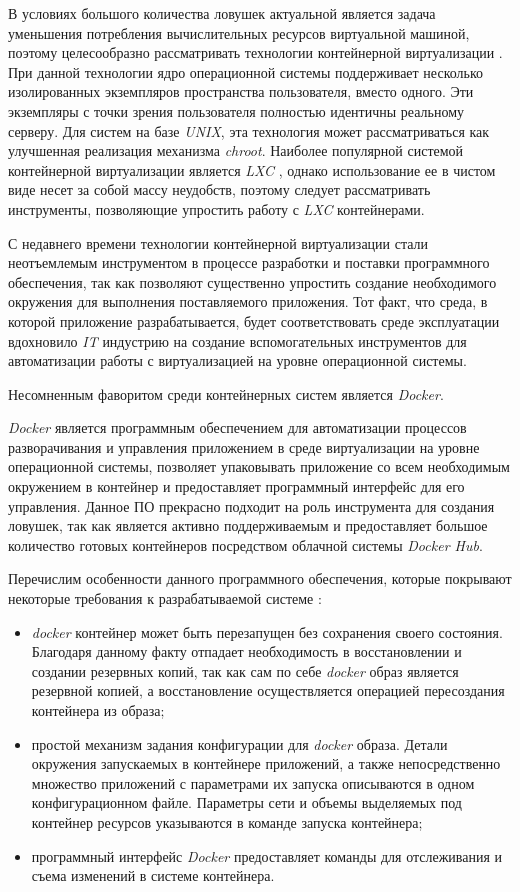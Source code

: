 В условиях большого количества ловушек актуальной является задача уменьшения потребления вычислительных ресурсов виртуальной машиной, поэтому целесообразно рассматривать технологии контейнерной виртуализации \citep{Joy2015}. При данной технологии ядро операционной системы поддерживает несколько изолированных экземпляров пространства пользователя, вместо одного. Эти экземпляры с точки зрения пользователя полностью идентичны реальному серверу. Для систем на базе \textit{UNIX}, эта технология может рассматриваться как улучшенная реализация механизма \textit{chroot}. Наиболее популярной системой контейнерной виртуализации является \textit{LXC} \citep{lxc_doc}, однако использование ее в чистом виде несет за собой массу неудобств, поэтому следует рассматривать инструменты, позволяющие упростить работу с \textit{LXC} контейнерами.

С недавнего времени технологии контейнерной виртуализации стали неотъемлемым инструментом в процессе разработки и поставки программного обеспечения, так как позволяют существенно упростить создание необходимого окружения для выполнения поставляемого приложения. Тот факт, что среда, в которой приложение разрабатывается, будет соответствовать среде эксплуатации вдохновило \textit{IT} индустрию на создание вспомогательных инструментов для автоматизации работы с виртуализацией на уровне операционной системы.

Несомненным фаворитом среди контейнерных систем является \textit{Docker}.

\textit{Docker} является программным обеспечением для автоматизации процессов разворачивания и управления приложением в среде виртуализации на уровне операционной системы, позволяет упаковывать приложение со всем необходимым окружением в контейнер и предоставляет программный интерфейс для его управления. Данное ПО прекрасно подходит на роль инструмента для создания ловушек, так как является активно поддерживаемым и предоставляет большое количество готовых контейнеров посредством облачной системы \textit{Docker Hub}.

Перечислим особенности данного программного обеспечения, которые покрывают некоторые требования к разрабатываемой системе \citep{Boettiger2015}:

\begin{itemize}
\item  \textit{docker} контейнер может быть перезапущен без сохранения своего состояния. Благодаря данному факту отпадает необходимость в восстановлении и создании резервных копий, так как сам по себе \textit{docker} образ является резервной копией, а восстановление осуществляется  операцией пересоздания контейнера из образа;
\item  простой механизм задания конфигурации для \textit{docker} образа. Детали окружения запускаемых в контейнере приложений, а также непосредственно множество приложений с параметрами их запуска описываются в одном конфигурационном файле. Параметры сети и объемы выделяемых под контейнер ресурсов указываются в команде запуска контейнера;
\item  программный интерфейс \textit{Docker} предоставляет команды для отслеживания и съема изменений в системе контейнера.
\end{itemize}

